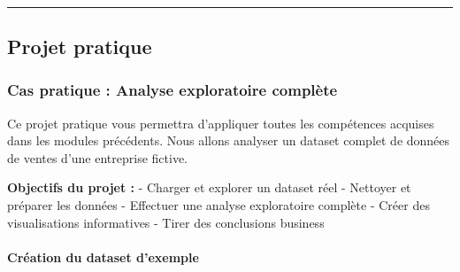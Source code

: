 \documentclass[11pt]{article}
\begin{document}
    \begin{center}
    \end{center}
    { \hspace*{\fill} \\}
    
    \begin{center}\rule{0.5\linewidth}{0.5pt}\end{center}

\subsection{Projet pratique}\label{projet-pratique}

\subsubsection{Cas pratique : Analyse exploratoire
complète}\label{cas-pratique-analyse-exploratoire-compluxe8te}

Ce projet pratique vous permettra d'appliquer toutes les compétences
acquises dans les modules précédents. Nous allons analyser un dataset
complet de données de ventes d'une entreprise fictive.

\textbf{Objectifs du projet :} - Charger et explorer un dataset réel -
Nettoyer et préparer les données - Effectuer une analyse exploratoire
complète - Créer des visualisations informatives - Tirer des conclusions
business

\paragraph{Création du dataset
d'exemple}\label{cruxe9ation-du-dataset-dexemple}
\end{document}

